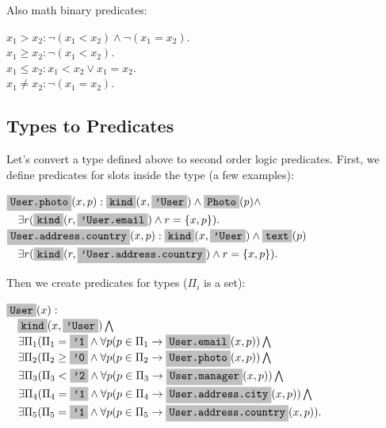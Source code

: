 \documentclass[12pt,oneside,letterpaper]{article}
\begin{document}
    Also math binary predicates:

    \begin{maths}
    $x_1 > x_2: \neg(x_1 < x_2) \wedge \neg(x_1 = x_2). $ \\
    $x_1 \geq x_2: \neg (x_1 < x_2). $ \\
    $x_1 \leq x_2: x_1 < x_2 \vee x_1 = x_2. $ \\
    $x_1 \neq x_2: \neg (x_1 = x_2). $ \\
    \end{maths}

    \subsection{Types to Predicates}

    Let's convert a type defined above to second order logic predicates.
    First, we define predicates for slots inside the type (a few examples):

    \begin{maths}
    $\type{User.photo}(x, p): \type{kind}(x, \type{'User}) \wedge \type{Photo}(p) \wedge$ \\
    $\quad \exists r (\type{kind}(r, \type{'User.email}) \wedge r = \{x, p\}). $ \\
    $\type{User.address.country}(x, p): \type{kind}(x, \type{'User}) \wedge \type{text}(p)$ \\
    $\quad \exists r (\type{kind}(r, \type{'User.address.country}) \wedge r = \{x, p\}). $ \\
    \end{maths}

    Then we create predicates for types ($\Pi_i$ is a set):

    \begin{maths}
    $\type{User}(x) :$ \\
    $\quad \type{kind}(x, \type{'User}) \bigwedge$ \\
    $\quad \exists \Pi_1 (\Pi_1 = \type{'1} \wedge \forall p(p \in \Pi_1 \to \type{User.email}(x, p)) \bigwedge$ \\
    $\quad \exists \Pi_2 (\Pi_2 \geq \type{'0} \wedge \forall p(p \in \Pi_2 \to \type{User.photo}(x, p)) \bigwedge$ \\
    $\quad \exists \Pi_3 (\Pi_3 < \type{'2} \wedge \forall p(p \in \Pi_3 \to \type{User.manager}(x, p)) \bigwedge $ \\
    $\quad \exists \Pi_4 (\Pi_4 = \type{'1} \wedge \forall p(p \in \Pi_4 \to \type{User.address.city}(x, p)) \bigwedge $ \\
    $\quad \exists \Pi_5 (\Pi_5 = \type{'1} \wedge \forall p(p \in \Pi_5 \to \type{User.address.country}(x, p)). $ \\
    \end{maths}
\end{document}
